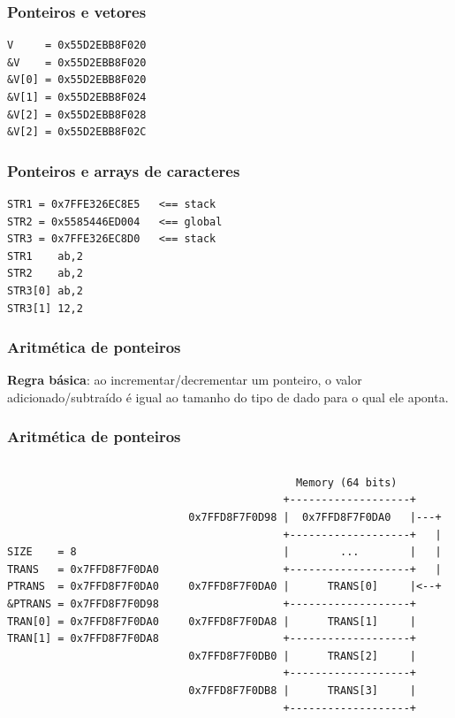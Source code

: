 \documentclass{beamer}
\begin{document}
\begin{frame}[fragile]
	\frametitle{Ponteiros e vetores}
		
	 {\scriptsize
	 	\begin{verbatim}
V     = 0x55D2EBB8F020
&V    = 0x55D2EBB8F020
&V[0] = 0x55D2EBB8F020
&V[1] = 0x55D2EBB8F024
&V[2] = 0x55D2EBB8F028
&V[2] = 0x55D2EBB8F02C
	\end{verbatim}
	}
\end{frame}

\begin{frame}[fragile]
	\frametitle{Ponteiros e arrays de caracteres}
		
	 {\scriptsize
	 	\begin{verbatim}
STR1 = 0x7FFE326EC8E5   <== stack
STR2 = 0x5585446ED004   <== global
STR3 = 0x7FFE326EC8D0   <== stack
STR1    ab,2
STR2    ab,2
STR3[0] ab,2
STR3[1] 12,2
	\end{verbatim}
	}
\end{frame}

\begin{frame}
	\frametitle{Aritmética de ponteiros}
	\textbf{Regra básica}: ao incrementar/decrementar um ponteiro, o valor adicionado/subtraído é igual ao tamanho do tipo de dado para o qual ele aponta.
	
\end{frame}

\begin{frame}[fragile]
	\frametitle{Aritmética de ponteiros}
	\begin{columns}[T] %
	\begin{column}{.4\textwidth}
	 {\footnotesize
	\begin{verbatim}




SIZE    = 8
TRANS   = 0x7FFD8F7F0DA0
PTRANS  = 0x7FFD8F7F0DA0
&PTRANS = 0x7FFD8F7F0D98
TRAN[0] = 0x7FFD8F7F0DA0
TRAN[1] = 0x7FFD8F7F0DA8
	\end{verbatim}
}
	\end{column}%
	\hfill%
	\begin{column}{.6\textwidth}
	 {\scriptsize
	\begin{verbatim}
                 Memory (64 bits)
               +-------------------+
0x7FFD8F7F0D98 |  0x7FFD8F7F0DA0   |---+
               +-------------------+   |
               |        ...        |   |
               +-------------------+   |
0x7FFD8F7F0DA0 |      TRANS[0]     |<--+
               +-------------------+
0x7FFD8F7F0DA8 |      TRANS[1]     |
               +-------------------+
0x7FFD8F7F0DB0 |      TRANS[2]     |
               +-------------------+
0x7FFD8F7F0DB8 |      TRANS[3]     |
               +-------------------+
	\end{verbatim}
}
	\end{column}%
\end{columns}
\end{frame}
\end{document}
